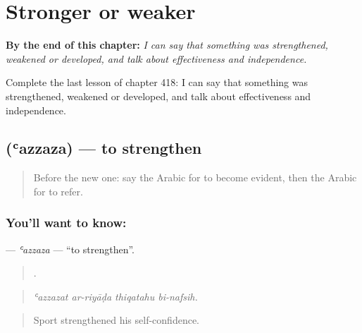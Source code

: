 
\chapter{Stronger or weaker}
\label{ch:ar-stronger-or-weaker}

\begin{chapteropening}
\textbf{By the end of this chapter:} \emph{I can say that something was strengthened, weakened or developed, and talk about effectiveness and independence.}

Complete the last lesson of chapter 418: I can say that something was strengthened, weakened or developed, and talk about effectiveness and independence.
\end{chapteropening}

\section[\texorpdfstring{\ar{عزز} (ʿazzaza)}{عزز (ʿazzaza)}]{ (ʿazzaza) — to strengthen}

\label{lesson:AR-C418-azzaza}



\begin{quote}
Before the new one: say the Arabic for to become evident, then the Arabic for to refer.
\end{quote}

\subsection*{You'll want to know: }
\textbf{} — \emph{ʿazzaza} — \textquotedblleft{}to strengthen\textquotedblright{}.

\begin{quote}
   .
\end{quote}

\begin{quote}
\emph{ʿazzazat ar-riyāḍa thiqatahu bi-nafsih.}
\end{quote}

\begin{quote}
Sport strengthened his self-confidence.
\end{quote}

